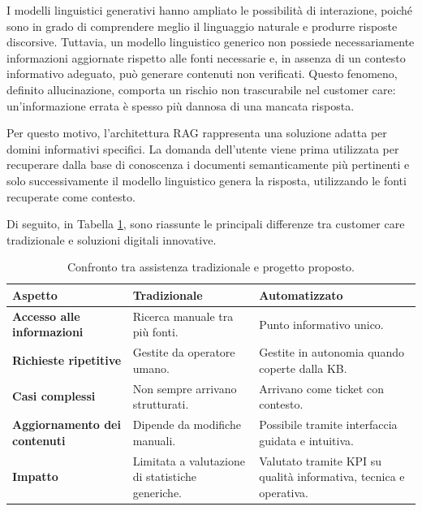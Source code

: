 I modelli linguistici generativi hanno ampliato le possibilità di interazione, poiché sono in grado di comprendere meglio il linguaggio naturale e produrre risposte discorsive. Tuttavia, un modello linguistico generico non possiede necessariamente informazioni aggiornate rispetto alle fonti necessarie e, in assenza di un contesto informativo adeguato, può generare contenuti non verificati. Questo fenomeno, definito allucinazione, comporta un rischio non trascurabile nel customer care: un'informazione errata è spesso più dannosa di una mancata risposta.

Per questo motivo, l’architettura RAG rappresenta una soluzione adatta per domini informativi specifici. La domanda dell’utente viene prima utilizzata per recuperare dalla base di conoscenza i documenti semanticamente più pertinenti e solo successivamente il modello linguistico genera la risposta, utilizzando le fonti recuperate come contesto.

Di seguito, in Tabella \ref{tab:valore-processo-assistenza}, sono riassunte le principali differenze tra customer care tradizionale e soluzioni digitali innovative.

\begin{longtable}{p{}p{}p{}}
\caption{Confronto tra assistenza tradizionale e progetto proposto.}\label{tab:valore-processo-assistenza}\\
\toprule
\textbf{Aspetto} & \textbf{Tradizionale} & \textbf{Automatizzato}\\
\midrule
\textbf{Accesso alle informazioni} & Ricerca manuale tra più fonti. & Punto informativo unico.\\
\textbf{Richieste ripetitive} & Gestite da operatore umano. & Gestite in autonomia quando coperte dalla KB.\\
\textbf{Casi complessi} & Non sempre arrivano strutturati. & Arrivano come ticket con contesto.\\
\textbf{Aggiornamento dei contenuti} & Dipende da modifiche manuali. & Possibile tramite interfaccia guidata e intuitiva.\\
\textbf{Impatto} & Limitata a valutazione di statistiche generiche. & Valutato tramite KPI su qualità informativa, tecnica e operativa.\\
\bottomrule
\end{longtable}